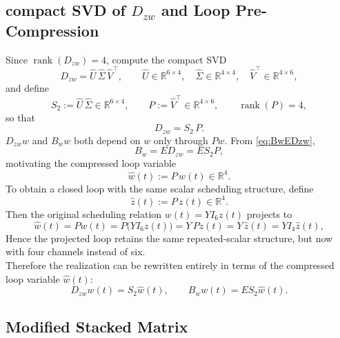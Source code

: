 \documentclass[11pt]{article}
\newcommand{\R}{\mathbb{R}}
\newcommand{\rank}{\operatorname{rank}}
\begin{document}
\subsection{compact SVD of $D_{zw}$ and Loop Pre-Compression}
Since $\rank(D_{zw}) = 4$, compute the compact SVD
\begin{equation}
    D_{zw} = \hat{U}\,\hat{\Sigma}\,\hat{V}^\top,
    \qquad
    \hat{U} \in \R^{6\times 4},\quad
    \hat{\Sigma} \in \R^{4\times 4},\quad
    \hat{V}^\top \in \R^{4\times 6},
    \label{eq:DzwSVD}
\end{equation}
and define
\begin{equation}
    S_2 := \hat{U}\,\hat{\Sigma} \in \R^{6\times 4},
    \qquad
    P := \hat{V}^\top \in \R^{4\times 6}, \qquad \rank(P) = 4,
    \label{eq:S2P}
\end{equation}
so that
\begin{equation}
    D_{zw} = S_2\,P.
    \label{eq:Dzwfactor}
\end{equation}
$D_{zw}w$ and $B_w w$ both depend on $w$ only through $Pw$. From \eqref{eq:BwEDzw},
\begin{equation}
    B_w = E D_{zw} = E S_2 P,
    \label{eq:BwES2P_repeat}
\end{equation}
motivating the compressed loop variable
\begin{equation}
    \hat{w}(t) := P\,w(t) \in \R^4.
    \label{eq:whatdef}
\end{equation}
To obtain a closed loop with the same scalar scheduling structure, define
\begin{equation}
    \hat{z}(t) := P\,z(t) \in \R^4.
    \label{eq:zhatdef}
\end{equation}
Then the original scheduling relation $w(t)=Y I_6 z(t)$ projects to
\begin{equation}
    \hat{w}(t)
    = P w(t)
    = P\bigl(Y I_6 z(t)\bigr)
    = Y\,P z(t)
    = Y\,\hat{z}(t)
    = Y I_4 \hat{z}(t),
    \label{eq:whatnew}
\end{equation}
Hence the projected loop
retains the same repeated-scalar structure, but now with four channels instead
of six.
\\
Therefore the realization can be rewritten entirely in terms of the compressed loop variable $\hat{w}(t)$:
\begin{equation}
    D_{zw} w(t) = S_2 \hat{w}(t),
    \qquad
    B_w w(t) = E S_2 \hat{w}(t).
    \label{eq:compressedwterms}
\end{equation}
\subsection{Modified Stacked Matrix}
\end{document}
